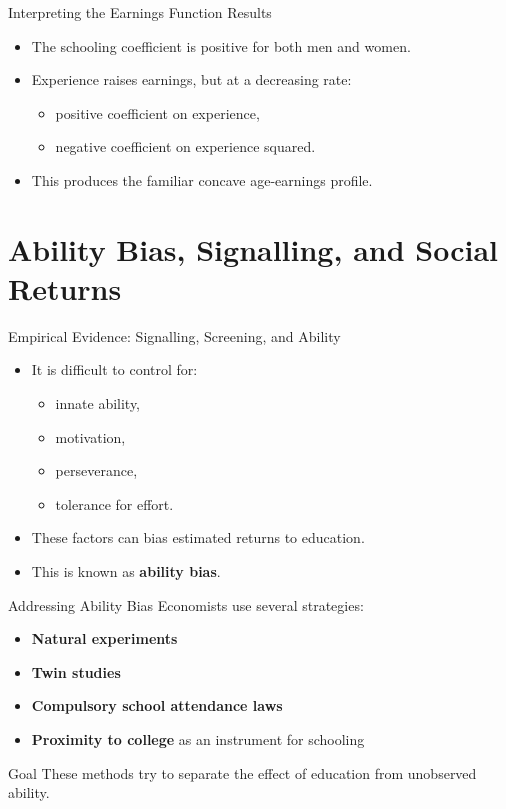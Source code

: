 \documentclass[aspectratio=169]{beamer}
\begin{document}
\begin{frame}{Interpreting the Earnings Function Results}
\transfade
\begin{itemize}[<+->]
  \item The schooling coefficient is positive for both men and women.
  \item Experience raises earnings, but at a decreasing rate:
  \begin{itemize}[<+->]
    \item positive coefficient on experience,
    \item negative coefficient on experience squared.
  \end{itemize}
  \item This produces the familiar concave age-earnings profile.
\end{itemize}
\end{frame}

\section{Ability Bias, Signalling, and Social Returns}

\begin{frame}{Empirical Evidence: Signalling, Screening, and Ability}
\transfade
\begin{itemize}[<+->]
  \item It is difficult to control for:
  \begin{itemize}[<+->]
    \item innate ability,
    \item motivation,
    \item perseverance,
    \item tolerance for effort.
  \end{itemize}
  \item These factors can bias estimated returns to education.
  \item This is known as \textbf{ability bias}.
\end{itemize}
\end{frame}

\begin{frame}{Addressing Ability Bias}
\transfade
Economists use several strategies:
\begin{itemize}[<+->]
  \item \textbf{Natural experiments}
  \item \textbf{Twin studies}
  \item \textbf{Compulsory school attendance laws}
  \item \textbf{Proximity to college} as an instrument for schooling
\end{itemize}

\begin{block}{Goal}
These methods try to separate the effect of education from unobserved ability.
\end{block}
\end{frame}
\end{document}
